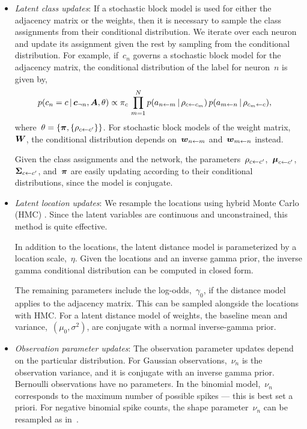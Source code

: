 \begin{itemize}
  \item \textit{Latent class updates}:
    If a stochastic block model is used for either the adjacency matrix
    or the weights, then it is necessary to sample the class assignments
    from their conditional distribution. We iterate over each neuron and
    update its assignment given the rest by sampling from the conditional
    distribution. For example, if~$c_n$ governs a stochastic block model
    for the adjacency matrix, the conditional distribution of the label
    for neuron~$n$ is given by,
    \begin{align}
      p(c_n = c \,|\, \boldsymbol{c}_{\neg n}, \boldsymbol{A}, \theta)
      &\propto \pi_{c} \,
      \prod_{m=1}^N p(a_{n \leftarrow m} \,|\, \rho_{c \leftarrow c_m}) \,
                    p(a_{m \leftarrow n} \,|\, \rho_{c_m \leftarrow c}),
    \end{align}
    where~$\theta = \{\boldsymbol{\pi}, \{\rho_{c \leftarrow c'}\} \}$. For stochastic block
    models of the weight matrix,~$\boldsymbol{W}$, the conditional distribution
    depends on~$\boldsymbol{w}_{n \leftarrow m}$ and~$\boldsymbol{w}_{m \leftarrow n}$ instead.

    Given the class assignments and the network, the
    parameters~$\rho_{c \leftarrow c'}$,~$\boldsymbol{\mu}_{c \leftarrow c'}$,~$\boldsymbol{\Sigma}_{c \leftarrow c'}$, and~$\boldsymbol{\pi}$ are easily updating
    according to their conditional distributions, since the model is
    conjugate.
    
  \item \textit{Latent location updates}:
    We resample the locations using hybrid Monte Carlo (HMC) \cite{Neal10}.
    Since the latent variables are continuous and unconstrained,
    this method is quite effective.

    In addition to the locations, the latent distance model is parameterized
    by a location scale,~$\eta$. Given the locations and an inverse gamma
    prior, the inverse gamma conditional distribution can be computed in
    closed form.
    
    The remaining parameters include the log-odds,~$\gamma_0$, if the
    distance model applies to the adjacency matrix. This can be
    sampled alongside the locations with HMC.  For a latent distance
    model of weights, the baseline mean and
    variance,~$(\mu_0,\sigma^2)$, are conjugate with a normal
    inverse-gamma prior.
    
  \item \textit{Observation parameter updates}:
    The observation parameter updates depend on the particular distribution.
    For Gaussian observations,~$\nu_n$ is the observation variance, and
    it is conjugate with an inverse gamma prior.
    Bernoulli observations have no parameters.
    In the binomial model,~$\nu_n$ corresponds to the maximum number of
    possible spikes --- this is best set a priori.
    For negative binomial spike counts, the shape parameter~$\nu_n$ can
    be resampled as in~\cite{Zhou2012}.

    
\end{itemize}

